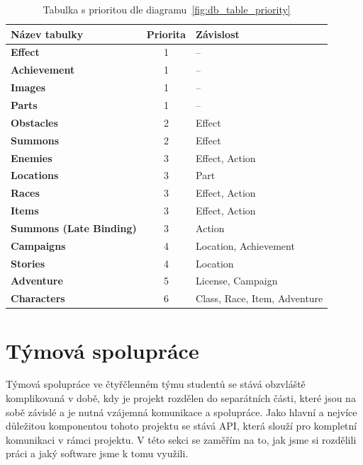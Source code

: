 \begin{table}[H]
    \centering
        \begin{tabular}{l c l}
            \toprule

            \textbf{Název tabulky} & \textbf{Priorita} & \textbf{Závislost} \\
            \midrule

            \textbf{Effect} & 1 & -- \\
            \textbf{Achievement} & 1 & -- \\
            \textbf{Images} & 1 & -- \\
            \textbf{Parts} & 1 & -- \\
            \textbf{Obstacles} & 2 & Effect \\
            \textbf{Summons} & 2 & Effect \\
            \textbf{Enemies} & 3 & Effect, Action \\
            \textbf{Locations} & 3 & Part \\
            \textbf{Races} & 3 & Effect, Action \\
            \textbf{Items} & 3 & Effect, Action \\
            \textbf{Summons (Late Binding)} & 3 & Action \\
            \textbf{Campaigns} & 4 & Location, Achievement \\
            \textbf{Stories} & 4 & Location \\
            \textbf{Adventure} & 5 & License, Campaign \\
            \textbf{Characters} & 6 & Class, Race, Item, Adventure \\

            \bottomrule
        \end{tabular}
    \caption{Tabulka s prioritou dle diagramu~\ref{fig:db_table_priority}
    \label{tab:db_table_priority}}
\end{table}

\section{Týmová spolupráce}
\label{sec:implementation-collaboration}
Týmová spolupráce ve čtyřčlenném týmu studentů se stává obzvláště komplikovaná v době, kdy je projekt rozdělen do separátních části, které jsou na sobě závislé a je nutná vzájemná komunikace a spolupráce. Jako hlavní a nejvíce důležitou komponentou tohoto projektu se stává API, která slouží pro kompletní komunikaci v rámci projektu. V této sekci se zaměřím na to, jak jsme si rozdělili práci a jaký software jsme k tomu využili.

